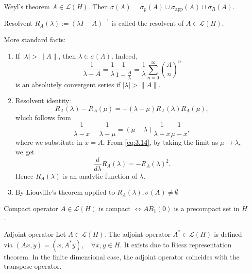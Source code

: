 \documentclass{report}
\begin{document}
\begin{theorem}{Weyl's theorem}{}
    \(A \in \mathcal{L}(H)\). Then \(\sigma(A) = \sigma_{p}(A) \cup \sigma_{\text{app}}(A) \cup \sigma_{R}(A)\).
\end{theorem}

\begin{definition}{Resolvent}{}
    \(R_{A}(\lambda) := (\lambda I - A)^{-1}\) is called the resolvent of \(A \in \mathcal{L}(H)\).
\end{definition}

More standard facts:
\begin{enumerate}
    \item If \(\vert \lambda \vert > \|A\|\), then \(\lambda \in \sigma(A)\). Indeed, 
    \[
        \frac{1}{\lambda - A} = \frac{1}{\lambda} \frac{1}{1-\frac{A}{\lambda}} = \frac{1}{\lambda} \sum_{n=0}^{\infty} \left(\frac{A}{n}\right)^{n}
    \]
    is an absolutely convergent series if \(\vert \lambda \vert  > \|A\| \).
    \item Resolvent identity:
    \begin{equation}\label{eq:3.14}
        R_{A}(\lambda) - R_{A}(\mu) = -(\lambda - \mu)R_{A}(\lambda)R_{A}(\mu),
    \end{equation}
    which follows from 
    \[
        \frac{1}{\lambda - x} - \frac{1}{\lambda - \mu} = (\mu - \lambda) \frac{1}{\lambda - x} \frac{1}{\mu - x},
    \]
    where we substitute in \(x = A\).
    From \ref{eq:3.14}, by taking the limit as \(\mu \to \lambda\), we get
    \[
        \frac{d}{d \lambda} R_{A}(\lambda) = -R_{A}(\lambda)^{2}.
    \]
    Hence \(R_{A}(\lambda)\) is an analytic function of \(\lambda\).
    \item By Liouville's theorem applied to \(R_{A}(\lambda), \sigma(A) \neq \emptyset\)
\end{enumerate}

\begin{definition}{Compact operator}{}
    \(A \in \mathcal{L}(H)\) is compact \(\iff AB_{1}(0)\) is a precompact set in \(H\).
\end{definition}

\begin{definition}{Adjoint operator}{}
    Let \(A \in  \mathcal{L}(H)\). The adjoint operator \(A^{*} \in \mathcal{L}(H)\) is defined via \((Ax, y) = (x, A^{*}y), \quad \forall x, y \in H\).
    It exists due to Riesz representation theorem. In the finite dimensional case, the adjoint operator coincides with the transpose operator.
\end{definition}
\end{document}

